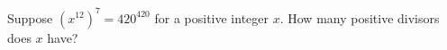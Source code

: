 Suppose $(x^{12})^7=420^{420}$ for a positive integer $x$. How many positive divisors does $x$ have?
